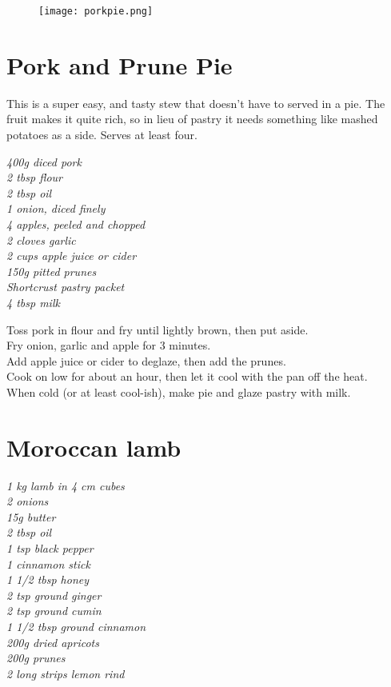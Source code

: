 \documentclass{tufte-book}
\begin{document}
\begin{figure}[h]
  \texttt{[image: porkpie.png]}
\end{figure}

\section{Pork and Prune Pie}

This is a super easy, and tasty stew that doesn't have to served in a pie. The fruit makes it quite rich, so in lieu of pastry it needs something like mashed potatoes as a side. Serves at least four.

\smallskip
\emph{400g diced pork
\\2 tbsp flour
\\2 tbsp oil
\\1 onion, diced finely
\\4 apples, peeled and chopped
\\2 cloves garlic
\\2 cups apple juice or cider
\\150g pitted prunes
\\Shortcrust pastry packet
\\4 tbsp milk}

\smallskip
Toss pork in flour and fry until lightly brown, then put aside.
\\Fry onion, garlic and apple for 3 minutes.
\\Add apple juice or cider to deglaze, then add the prunes.
\\Cook on low for about an hour, then let it cool with the pan off the heat.
\\When cold (or at least cool-ish), make pie and glaze pastry with milk.


\section{Moroccan lamb}

\emph{1 kg lamb in 4 cm cubes
\\2 onions
\\15g butter
\\2 tbsp oil
\\1 tsp black pepper
\\1 cinnamon stick
\\1 1/2 tbsp honey
\\2 tsp ground ginger
\\2 tsp ground cumin
\\1 1/2 tbsp ground cinnamon
\\200g dried apricots
\\200g prunes
\\2 long strips lemon rind}
\end{document}
